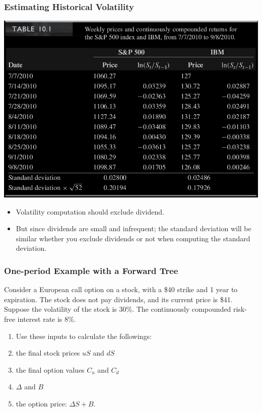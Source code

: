 \begin{frame}[fragile,t]
	\frametitle{Estimating Historical Volatility}
\begin{center}
	\includegraphics[scale=0.25]{figs/Table-10-1.png}
	\vfill

	\begin{itemize}
		\item Volatility computation should exclude dividend.
		\item But since dividends are small and infrequent; the standard deviation will be similar
			whether you exclude dividends or not when computing the standard deviation.
	\end{itemize}
\end{center}
\end{frame}
\begin{frame}[fragile,t]
	\frametitle{One-period Example with a Forward Tree}
\begin{myexample}
	Consider a European call option on a stock, with a \$40 strike and 1 year to expiration. The stock
	does not pay dividends, and its current price is \$41. Suppose the volatility of the stock is
	30\%. The continuously compounded risk-free interest rate is 8\%.
	\begin{enumerate}
		\item[] Use these inputs to calculate the followings:
		\item the final stock prices $uS$ and $dS$
		\item the final option values $C_u$ and $C_d$
		\item $\Delta$ and $B$
		\item the option price: $\Delta S+B$.
	\end{enumerate}
\end{myexample}
\end{frame}
